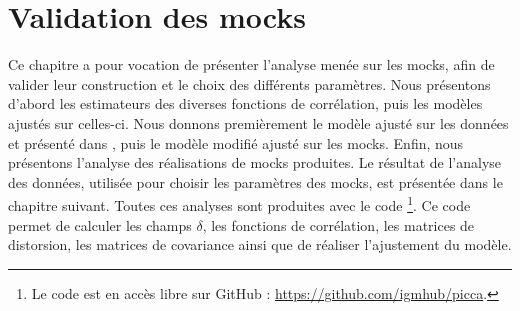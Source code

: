 
% 

% 


\graphicspath{ {../figures/mocks_ana/} }

\chapter{Validation des mocks}
\label{chap:mock_ana}
\minitoc
\newpage
\thispagestyle{fancy}


Ce chapitre a pour vocation de présenter l'analyse menée sur les mocks, afin de valider leur construction et le choix des différents paramètres.
Nous présentons d'abord les estimateurs des diverses fonctions de corrélation, puis les modèles ajustés sur celles-ci.
Nous donnons premièrement le modèle ajusté sur les données et présenté dans \textcite{DuMasdesBourboux2020}, puis le modèle modifié ajusté sur les mocks.
Enfin, nous présentons l'analyse des \Nmocks{} réalisations de mocks produites. Le résultat de l'analyse des données, utilisée pour choisir les paramètres \lya{} des mocks, est présentée dans le chapitre suivant.
Toutes ces analyses sont produites avec le code \picca{}\footnote{Le code est en accès libre sur GitHub : \url{https://github.com/igmhub/picca}.}. Ce code permet de calculer les champs $\delta$, les fonctions de corrélation, les matrices de distorsion, les matrices de covariance ainsi que de réaliser l'ajustement du modèle.

